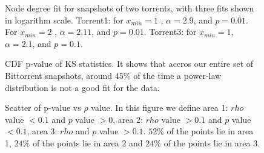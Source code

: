 \documentclass[10pt,conference,letterpaper]{IEEEtran}
\begin{document}
\begin{figure}
\centering
{}
\caption{Node degree fit for snapshots of two torrents, with three fits shown in logarithm scale. Torrent1: for $x_{min}=1$ , $\alpha = 2.9$, and $p=0.01$. For $x_{min}=2$ , $\alpha = 2.11$, and $p = 0.01$. Torrent3: for $x_{min}=1$, $\alpha = 2.1$, and $p = 0.1$. }
\label{fig:fitting}
\vspace{-2mm}
\end{figure}

\begin{figure}
\centering
\caption{CDF p-value of KS statistics. It shows that accros our entire set of Bittorrent snapshots, around $45\%$ of the time a power-law distribution is not a good fit for the data.} 
\label{fig:cdf-p}
\vspace{-2mm}
\end{figure}




\begin{figure}
\centering
{}
\caption{Scatter of p-value vs $\rho$ value. In this figure we define area 1: $rho$ value $<0.1$ and $p$ value $>0$, area 2: $rho$ value $>0.1$ and $p$ value $<0.1$, area 3: $rho$ and $p$ value $>0.1$. $52\%$ of the points lie in area 1, $24\%$ of the points lie in area 2 and $24\%$ of the points lie in area 3.} 
\label{fig:scatter-pvalue-vs-rho}
\vspace{-2mm}
\end{figure}
\end{document}
